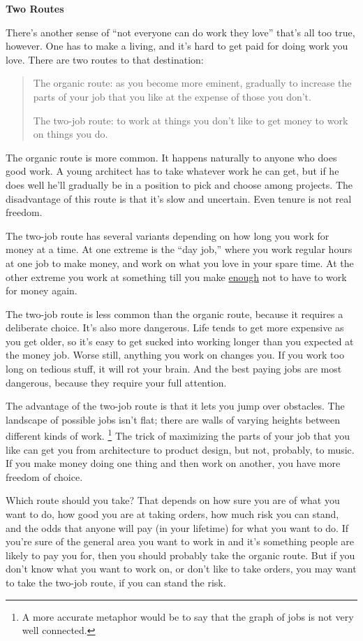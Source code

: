 \textbf{Two Routes}

There's another sense of ``not everyone can do work they love'' that's
all too true, however. One has to make a living, and it's hard to get
paid for doing work you love. There are two routes to that destination:

\begin{quote}
The organic route: as you become more eminent, gradually to increase the
parts of your job that you like at the expense of those you don't.

The two-job route: to work at things you don't like to get money to work
on things you do.
\end{quote}

The organic route is more common. It happens naturally to anyone who
does good work. A young architect has to take whatever work he can get,
but if he does well he'll gradually be in a position to pick and choose
among projects. The disadvantage of this route is that it's slow and
uncertain. Even tenure is not real freedom.

The two-job route has several variants depending on how long you work
for money at a time. At one extreme is the ``day job,'' where you work
regular hours at one job to make money, and work on what you love in
your spare time. At the other extreme you work at something till you
make \href{wealth.html}{enough} not to have to work for money again.

The two-job route is less common than the organic route, because it
requires a deliberate choice. It's also more dangerous. Life tends to
get more expensive as you get older, so it's easy to get sucked into
working longer than you expected at the money job. Worse still, anything
you work on changes you. If you work too long on tedious stuff, it will
rot your brain. And the best paying jobs are most dangerous, because
they require your full attention.

The advantage of the two-job route is that it lets you jump over
obstacles. The landscape of possible jobs isn't flat; there are walls of
varying heights between different kinds of work. \footnote{A more accurate metaphor would be to say that the graph of jobs
is not very well connected.}
The trick of maximizing the parts of your job that you like can get you
from architecture to product design, but not, probably, to music. If you
make money doing one thing and then work on another, you have more
freedom of choice.

Which route should you take? That depends on how sure you are of what
you want to do, how good you are at taking orders, how much risk you can
stand, and the odds that anyone will pay (in your lifetime) for what you
want to do. If you're sure of the general area you want to work in and
it's something people are likely to pay you for, then you should
probably take the organic route. But if you don't know what you want to
work on, or don't like to take orders, you may want to take the two-job
route, if you can stand the risk.

